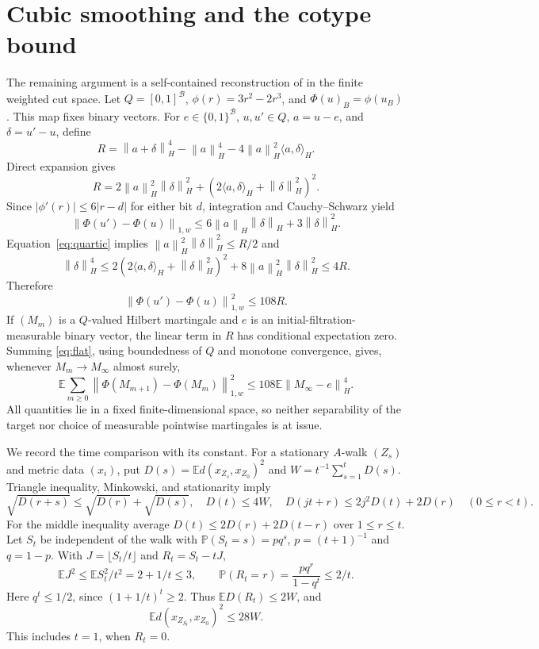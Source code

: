 \documentclass[11pt]{article}
\newcommand{\E}{\mathbb E}
\newcommand{\Prob}{\mathbb P}
\newcommand{\norm}[1]{\left\lVert#1\right\rVert}
\newcommand{\1}{\mathbf1}
\begin{document}
\section{Cubic smoothing and the cotype bound}
The remaining argument is a self-contained reconstruction of \cite{OAI332} in the finite weighted cut space. Let $Q=[0,1]^{\mathcal B}$, $\phi(r)=3r^2-2r^3$, and $\Phi(u)_B=\phi(u_B)$. This map fixes binary vectors. For $e\in\{0,1\}^{\mathcal B}$, $u,u'\in Q$, $a=u-e$, and $\delta=u'-u$, define
\[
 R=\norm{a+\delta}_H^4-\norm a_H^4-4\norm a_H^2\langle a,\delta\rangle_H.
\]
Direct expansion gives
\begin{equation}\label{eq:quartic}
 R=2\norm a_H^2\norm\delta_H^2+
       (2\langle a,\delta\rangle_H+\norm\delta_H^2)^2.
\end{equation}
Since $|\phi'(r)|\leq6|r-d|$ for either bit $d$, integration and Cauchy--Schwarz yield
\[
 \norm{\Phi(u')-\Phi(u)}_{1,w}
 \leq6\norm a_H\norm\delta_H+3\norm\delta_H^2.
\]
Equation~\eqref{eq:quartic} implies $\norm a_H^2\norm\delta_H^2\leq R/2$ and
\[
 \norm\delta_H^4\leq
 2(2\langle a,\delta\rangle_H+\norm\delta_H^2)^2
       +8\norm a_H^2\norm\delta_H^2\leq4R.
\]
Therefore
\begin{equation}\label{eq:flat}
 \norm{\Phi(u')-\Phi(u)}_{1,w}^2\leq108R.
\end{equation}
If $(M_m)$ is a $Q$-valued Hilbert martingale and $e$ is an initial-filtration-measurable binary vector, the linear term in $R$ has conditional expectation zero. Summing \eqref{eq:flat}, using boundedness of $Q$ and monotone convergence, gives, whenever $M_m\to M_\infty$ almost surely,
\begin{equation}\label{eq:mart}
 \E\sum_{m\geq0}\norm{\Phi(M_{m+1})-\Phi(M_m)}_{1,w}^2
 \leq108\E\norm{M_\infty-e}_H^4.
\end{equation}
All quantities lie in a fixed finite-dimensional space, so neither separability of the target nor choice of measurable pointwise martingales is at issue.

We record the time comparison with its constant. For a stationary $A$-walk $(Z_s)$ and metric data $(x_i)$, put $D(s)=\E d(x_{Z_s},x_{Z_0})^2$ and $W=t^{-1}\sum_{s=1}^tD(s)$. Triangle inequality, Minkowski, and stationarity imply
\[
 \sqrt{D(r+s)}\leq\sqrt{D(r)}+\sqrt{D(s)},\quad D(t)\leq4W,\quad
 D(jt+r)\leq2j^2D(t)+2D(r)\quad(0\leq r<t).
\]
For the middle inequality average $D(t)\leq2D(r)+2D(t-r)$ over $1\leq r\leq t$. Let $S_t$ be independent of the walk with $\Prob(S_t=s)=pq^s$, $p=(t+1)^{-1}$ and $q=1-p$. With $J=\lfloor S_t/t\rfloor$ and $R_t=S_t-tJ$,
\[
 \E J^2\leq\E S_t^2/t^2=2+1/t\leq3,\qquad
 \Prob(R_t=r)=\frac{pq^r}{1-q^t}\leq2/t.
\]
Here $q^t\leq1/2$, since $(1+1/t)^t\geq2$. Thus $\E D(R_t)\leq2W$, and
\begin{equation}\label{eq:geometric}
 \E d(x_{Z_{S_t}},x_{Z_0})^2\leq28W.
\end{equation}
This includes $t=1$, when $R_t=0$.
\end{document}
